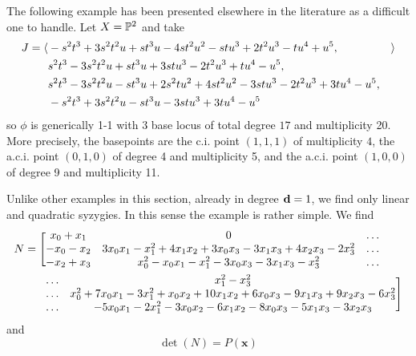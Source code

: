 \documentclass[fleqn,reqno]{amsart}
\begin{document}
\begin{example}[$\mt{ex310}$]
\label{ex310}
The following example has been presented elsewhere in the literature as a difficult one to handle.
Let $X=\mathbb{P}^2$ and take
\begin{align*}
	J=\langle &-s^{2} t^{3}+3 s^{2} t^{2} u+s t^{3} u-4 s t^{2} u^{2}-s t
	      u^{3}+2 t^{2} u^{3}-t u^{4}+u^{5}, &\rangle\\
		  &s^{2} t^{3}-3 s^{2} t^{2} u+s t^{3} u+3 s t
	      u^{3}-2 t^{2} u^{3}+t u^{4}-u^{5},\\
		  &s^{2} t^{3}-3 s^{2} t^{2} u-s t^{3} u+2
	      s^{2} t u^{2}+4 s t^{2} u^{2}-3 s t u^{3}-2 t^{2} u^{3}+3 t u^{4}-u^{5},\\
		  &-s^{2}
	      t^{3}+3 s^{2} t^{2} u-s t^{3} u-3 s t u^{3}+3 t u^{4}-u^{5}
\end{align*}
so $\phi$ is generically 1-1
with 3 base locus of total degree $17$ and multiplicity 20.
More precisely, the basepoints are the c.i. point $(1,1,1)$ of multiplicity $4$,
the a.c.i. point $(0,1,0)$ of degree 4 and multiplicity 5, and
the a.c.i. point $(1,0,0)$ of degree 9 and multiplicity 11.

Unlike other examples in this section,
already in degree $\mathbf d=1$,
we find only linear and quadratic syzygies.
In this sense the example is rather simple.
We find
\begin{align*}
	N=\Bigg[&\bgroup\begin{matrix}{x}_{0}+{x}_{1}&
      0&\ldots\\
      -{x}_{0}-{x}_{2}&
      3 {x}_{0} {x}_{1}-{x}_{1}^{2}+4 {x}_{1} {x}_{2}+3 {x}_{0} {x}_{3}-3 {x}_{1} {x}_{3}+4 {x}_{2} {x}_{3}-2 {x}_{3}^{2}&\ldots\\
      -{x}_{2}+{x}_{3}&
      {x}_{0}^{2}-{x}_{0} {x}_{1}-{x}_{1}^{2}-3 {x}_{0} {x}_{3}-3 {x}_{1} {x}_{3}-{x}_{3}^{2}&\ldots
      \end{matrix}\egroup\\
	  &\bgroup\begin{matrix}
	  \ldots&{x}_{1}^{2}-{x}_{3}^{2}\\
	  \ldots&{x}_{0}^{2}+7 {x}_{0} {x}_{1}-3 {x}_{1}^{2}+{x}_{0} {x}_{2}+10 {x}_{1} {x}_{2}+6 {x}_{0} {x}_{3}-9 {x}_{1} {x}_{3}+9 {x}_{2} {x}_{3}-6 {x}_{3}^{2}\\
	  \ldots&-5 {x}_{0} {x}_{1}-2 {x}_{1}^{2}-3 {x}_{0} {x}_{2}-6 {x}_{1} {x}_{2}-8 {x}_{0} {x}_{3}-5 {x}_{1} {x}_{3}-3 {x}_{2} {x}_{3}
	  \end{matrix}\egroup\Bigg]
\end{align*}
and
\[
	\det(N)=P(\mathbf x)
\]
\end{example}
\end{document}
